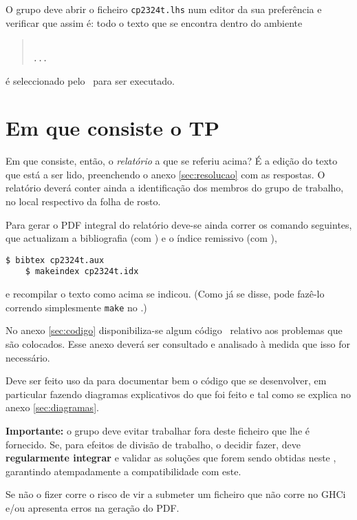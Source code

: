 \documentclass[11pt, a4paper, fleqn]{article}
\begin{document}
\noindent O grupo deve abrir o ficheiro \texttt{cp2324t.lhs} num editor da sua preferência
e verificar que assim é: todo o texto que se encontra dentro do ambiente
\begin{quote}\small\tt
{}
\\ ... \\
\end{quote}
é seleccionado pelo \GHCi\ para ser executado.

\section{Em que consiste o TP}

Em que consiste, então, o \emph{relatório} a que se referiu acima?
É a edição do texto que está a ser lido, preenchendo o anexo \ref{sec:resolucao}
com as respostas. O relatório deverá conter ainda a identificação dos membros
do grupo de trabalho, no local respectivo da folha de rosto.

Para gerar o PDF integral do relatório deve-se ainda correr os comando seguintes,
que actualizam a bibliografia (com \Bibtex) e o índice remissivo (com \Makeindex),
\begin{Verbatim}[fontsize=\small]
    $ bibtex cp2324t.aux
    $ makeindex cp2324t.idx
\end{Verbatim}
e recompilar o texto como acima se indicou. (Como já se disse, pode fazê-lo
correndo simplesmente \texttt{make} no \container.)

No anexo \ref{sec:codigo} disponibiliza-se algum código \Haskell\ relativo
aos problemas que são colocados. Esse anexo deverá ser consultado e analisado
à medida que isso for necessário.

Deve ser feito uso da  para documentar bem o código que se
desenvolver, em particular fazendo diagramas explicativos do que foi feito e
tal como se explica no anexo \ref{sec:diagramas}.

\begin{alert}
\textbf{Importante:} o grupo deve evitar trabalhar fora deste ficheiro 
que lhe é fornecido. Se, para efeitos de divisão de trabalho, o decidir fazer,
deve \textbf{regularmente integrar} e validar as soluções que forem sendo
obtidas neste , garantindo atempadamente a compatibilidade com este.

Se não o fizer corre o risco de vir a submeter um ficheiro que não corre
no GHCi e/ou apresenta erros na geração do PDF.
\end{alert}
\end{document}
